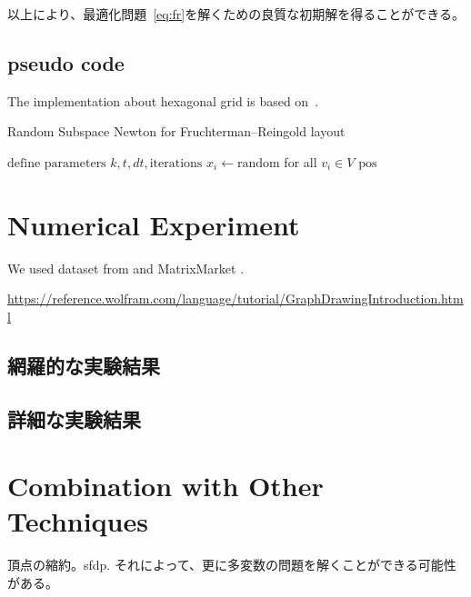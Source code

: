 \documentclass[dvipdfmx,lettersize,journal]{IEEEtran}
\begin{document}
以上により、最適化問題~\eqref{eq:fr}を解くための良質な初期解を得ることができる。

\subsection{pseudo code}\label{ssec:pseudoCode}

The implementation about hexagonal grid is based on~\cite{patelHexagonalGrids2013}.

\begin{algorithm}[ht]
  \caption{Random Subspace Newton for Fruchterman--Reingold layout}
  \label{alg:rsn}

  $\text{define parameters } k, t, dt, \text{iterations}$\;
  $x_i \gets \text{random}$ for all $v_i \in V$\;
  \Return $\text{pos}$
\end{algorithm}

\section{Numerical Experiment} \label{sec:experiment}

We used dataset from \cite{davis2011university} and MatrixMarket \cite{boisvertMatrixMarketWeb1997}.

\url{https://reference.wolfram.com/language/tutorial/GraphDrawingIntroduction.html}

\subsection{網羅的な実験結果}\label{ssec:exprAll}
\subsection{詳細な実験結果}\label{ssec:exprDetail}

\section{Combination with Other Techniques}\label{sec:combination}

頂点の縮約。sfdp.
それによって、更に多変数の問題を解くことができる可能性がある。
\end{document}
